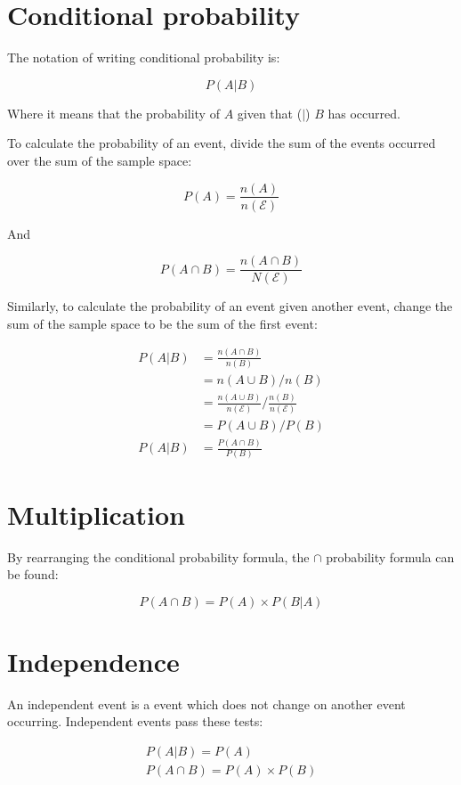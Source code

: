\documentclass{book}
\begin{document}
\section{Conditional probability}
The notation of writing conditional probability is:

\[
	P(A|B)
\]

Where it means that the probability of $A$ given that ($|$) $B$ has occurred.

To calculate the probability of an event, divide the sum of the events occurred over the sum of the sample space:

\[
	P(A) = \frac{n(A)}{n(\mathcal{E})}
\]

And

\[
	P(A \cap B) = \frac{n(A \cap B)}{N(\mathcal{E})}
\]

Similarly, to calculate the probability of an event given another event, change the sum of the sample space to be the sum of the first event:

\begin{align*}
	P(A|B) & = \frac{n(A \cap B)}{n(B)}                                         \\
	       & = n(A \cup B) / n(B)                                               \\
	       & = \frac{n(A \cup B)}{n(\mathcal{E})} / \frac{n(B)}{n(\mathcal{E})} \\
	       & = P(A \cup B) / P(B)                                               \\
	P(A|B) & = \frac{P(A \cap B)}{P(B)}
\end{align*}



\section{Multiplication}
By rearranging the conditional probability formula, the $\cap$ probability formula can be found:

\[
	P(A \cap B) = P(A) \times P(B|A)
\]



\section{Independence}
An independent event is a event which does not change on another event occurring.  Independent events pass these tests:

\begin{align*}
	P(A|B) = P(A) \\
	P(A \cap B) = P(A) \times P(B)
\end{align*}
\end{document}
